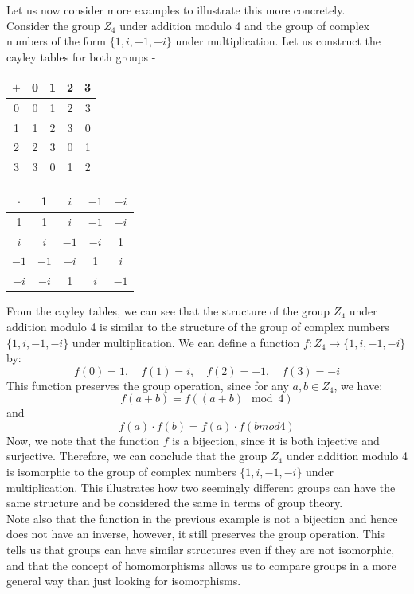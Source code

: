\documentclass[openany]{book}
\begin{document}
Let us now consider more examples to illustrate this more concretely. \\
Consider the group $Z_4$ under addition modulo 4 and the group of complex numbers of the form $\{1, i, -1, -i\}$ under multiplication. Let us construct the cayley tables for both groups -
\begin{center}
\begin{tabular}{c|cccc}
$+$ & 0 & 1 & 2 & 3 \\
\hline
0 & 0 & 1 & 2 & 3 \\
1 & 1 & 2 & 3 & 0 \\
2 & 2 & 3 & 0 & 1 \\
3 & 3 & 0 & 1 & 2 \\
\end{tabular}
\begin{tabular}{c|cccc}
$\cdot$ & 1 & $i$ & $-1$ & $-i$ \\
\hline
1 & 1 & $i$ & $-1$ & $-i$ \\
$i$ & $i$ & $-1$ & $-i$ & 1 \\
$-1$ & $-1$ & $-i$ & 1 & $i$ \\
$-i$ & $-i$ & 1 & $i$ & $-1$ \\
\end{tabular}
\end{center}
From the cayley tables, we can see that the structure of the group \(Z_4\) under addition modulo 4 is similar to the structure of the group of complex numbers \(\{1, i, -1, -i\}\) under multiplication. We can define a function \(f: Z_4 \to \{1, i, -1, -i\}\) by:
\[f(0) = 1, \quad f(1) = i, \quad f(2) = -1, \quad f(3) = -i\]
This function preserves the group operation, since for any \(a, b \in Z_4\), we have:
\[f(a + b) = f((a + b) \mod 4)\]
and
\[f(a) \cdot f(b) = f(a) \cdot f(bmod 4)\]
Now, we note that the function \(f\) is a bijection, since it is both injective and surjective. Therefore, we can conclude that the group \(Z_4\) under addition modulo 4 is isomorphic to the group of complex numbers \(\{1, i, -1, -i\}\) under multiplication. This illustrates how two seemingly different groups can have the same structure and be considered the same in terms of group theory. \\
Note also that the function in the previous example is not a bijection and hence does not have an inverse, however, it still preserves the group operation. This tells us that groups can have similar structures even if they are not isomorphic, and that the concept of homomorphisms allows us to compare groups in a more general way than just looking for isomorphisms. 
\end{document}
